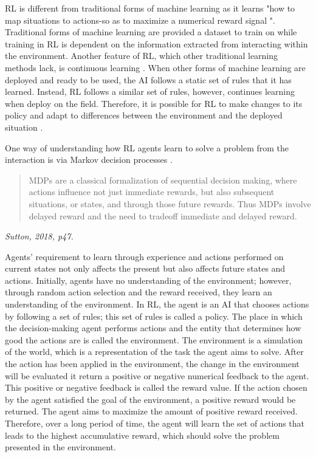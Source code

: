 RL is different from traditional forms of machine learning as it learns "how to map situations to actions-so as to maximize a numerical reward signal \cite{Sutton1}". Traditional forms of machine learning are provided a dataset to train on while training in RL is dependent on the information extracted from interacting within the environment. Another feature of RL, which other traditional learning methods lack, is continuous learning \cite{sreenivas2022safe}. When other forms of machine learning are deployed and ready to be used, the AI follows a static set of rules that it has learned. Instead, RL follows a similar set of rules, however, continues learning when deploy on the field. Therefore, it is possible for RL to make changes to its policy and adapt to differences between the environment and the deployed situation \cite{sreenivas2022safe}.

One way of understanding how RL agents learn to solve a problem from the interaction is via Markov decision processes \cite{Sutton1}.

\begin{quote}
MDPs are a classical formalization of sequential decision making,
where actions influence not just immediate rewards, but also subsequent situations, or
states, and through those future rewards. Thus MDPs involve delayed reward and the
need to tradeoff immediate and delayed reward.
\end{quote}
\hspace*{\fill} \textit{Sutton, 2018, p47.}

Agents' requirement to learn through experience and actions performed on current states not only affects the present but also affects future states and actions. Initially, agents have no understanding of the environment; however, through random action selection and the reward received, they learn an understanding of the environment. In RL, the agent is an AI that chooses actions by following a set of rules; this set of rules is called a policy. The place in which the decision-making agent performs actions and the entity that determines how good the actions are is called the environment. The environment is a simulation of the world, which is a representation of the task the agent aims to solve. After the action has been applied in the environment, the change in the environment will be evaluated it return a positive or negative numerical feedback to the agent. This positive or negative feedback is called the reward value. If the action chosen by the agent satisfied the goal of the environment, a positive reward would be returned. The agent aims to maximize the amount of positive reward received. Therefore, over a long period of time, the agent will learn the set of actions that leads to the highest accumulative reward, which should solve the problem presented in the environment. 

